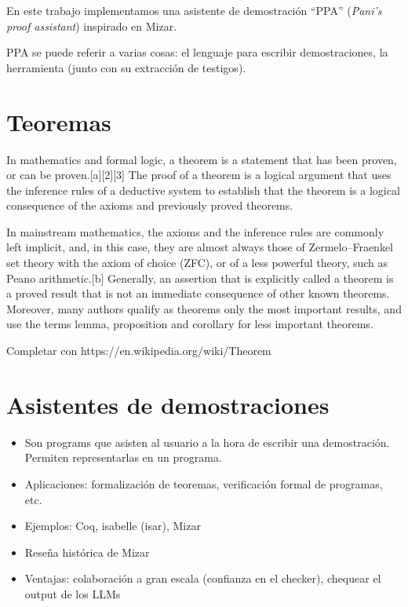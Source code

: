 

En este trabajo implementamos una asistente de demostración ``PPA''
(\textit{Pani's proof assistant}) inspirado en Mizar.

PPA se puede referir a varias cosas: el lenguaje para escribir demostraciones,
la herramienta (junto con su extracción de testigos).


\section{Teoremas}

In mathematics and formal logic, a theorem is a statement that has been proven, or can be proven.[a][2][3] The proof of a theorem is a logical argument that uses the inference rules of a deductive system to establish that the theorem is a logical consequence of the axioms and previously proved theorems.

In mainstream mathematics, the axioms and the inference rules are commonly left implicit, and, in this case, they are almost always those of Zermelo–Fraenkel set theory with the axiom of choice (ZFC), or of a less powerful theory, such as Peano arithmetic.[b] Generally, an assertion that is explicitly called a theorem is a proved result that is not an immediate consequence of other known theorems. Moreover, many authors qualify as theorems only the most important results, and use the terms lemma, proposition and corollary for less important theorems.

Completar con https://en.wikipedia.org/wiki/Theorem

\section{Asistentes de demostraciones}

\begin{itemize}
    \item Son programs que asisten al usuario a la hora de escribir una
    demostración. Permiten representarlas en un programa.
    \item Aplicaciones: formalización de teoremas, verificación formal de
    programas, etc.
    \item Ejemplos: Coq, isabelle (isar), Mizar
    \item Reseña histórica de Mizar
    \item Ventajas: colaboración a gran escala (confianza en el checker),
    chequear el output de los LLMs
\end{itemize}

